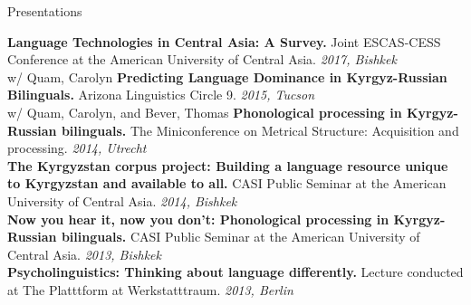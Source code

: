 \documentclass{resume} %
\begin{document}

\begin{minipage}{\textwidth}

\begin{rSection}{Presentations}
\vspace{.25cm}

  {\bf Language Technologies in Central Asia: A Survey.} {Joint ESCAS-CESS Conference at the American University of Central Asia.} \hfill {\em 2017, Bishkek} \\
  
{w/ Quam, Carolyn} {\bf Predicting Language Dominance in Kyrgyz-Russian Bilinguals.} {Arizona Linguistics Circle 9.} \hfill {\em 2015, Tucson} \\

{w/ Quam, Carolyn, and Bever, Thomas} {\bf Phonological processing in Kyrgyz-Russian bilinguals.} {The Miniconference on Metrical Structure: Acquisition and processing.} \hfill {\em 2014, Utrecht} \\

{\bf The Kyrgyzstan corpus project: Building a language resource unique to Kyrgyzstan and available to all.} {CASI Public Seminar at the American University of Central Asia.} \hfill {\em 2014, Bishkek} \\

{\bf Now you hear it, now you don’t: Phonological processing in Kyrgyz-Russian bilinguals.} {CASI Public Seminar at the American University of Central Asia.} \hfill {\em 2013, Bishkek} \\

{\bf Psycholinguistics: Thinking about language differently.} {Lecture conducted at The Platttform at Werkstatttraum.} \hfill {\em 2013, Berlin} \\


\end{rSection}
\end{minipage}
\end{document}
